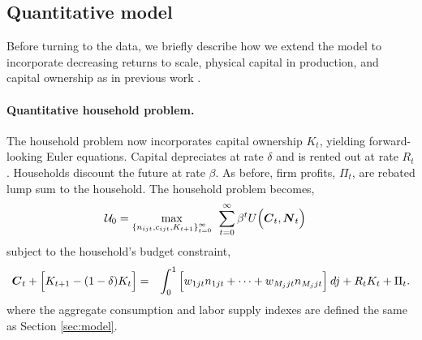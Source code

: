 \documentclass[12pt]{article}
\theoremstyle{prop}
\begin{document}
\subsection{Quantitative model}\label{sec:quantitative} 
Before turning to the data, we briefly describe how we extend the model to incorporate decreasing returns to scale, physical capital in production, and capital ownership as in previous work \citep[see][]{berger2022labor}. %

\paragraph{Quantitative household problem.} 
The household problem now incorporates capital ownership $K_t$, yielding forward-looking Euler equations. Capital depreciates at rate $\delta$ and is rented out at rate $R_t$.  Households discount the future at rate $\beta$.  As before, firm profits, $\Pi_t$, are rebated lump sum to the household. The household problem becomes,
\vspace*{-.2cm}\begin{align}\label{eq:u0_quant}
	\mathcal{U}_0 &= \max_{\left\{n_{ijt},c_{ijt},K_{t+1}\right\}_{t=0}^\infty}\:\:
	\sum_{t=0}^\infty \beta^t  U\Big(\boldsymbol{C}_{t},\boldsymbol{N}_t\Big)
	\vspace*{-.2cm}\end{align}
subject to the household's budget constraint,
{\small
	\vspace*{-.2cm}\begin{eqnarray}\label{eq:bc_quant}	
		\boldsymbol{C}_t + \Big[K_{t+1} - (1-\delta)K_t\Big]  &=& \int_0^1 \Big[w_{1jt}n_{1jt}+\dots + w_{M_{j}jt}n_{M_{j}jt}\Big]\:dj + R_tK_t + \Pi_t.
		\vspace*{-.2cm}\end{eqnarray}}
where the aggregate consumption and labor supply indexes are defined the same as Section \ref{sec:model}.
\end{document}
